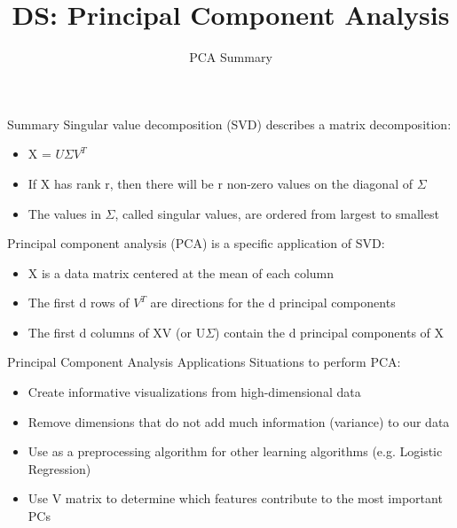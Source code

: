 \documentclass[aspectratio=169]{../latex_main/tntbeamer}  %
\title[Introduction]{DS: Principal Component Analysis}
\subtitle{PCA Summary}
\begin{document}
	
	\maketitle
	\begin{frame}{Summary}
	    Singular value decomposition (SVD) describes a matrix decomposition: 
	    \begin{itemize}
	        \item X = $U\Sigma V^T$
	        \item If X has rank r, then there will be r non-zero values on the diagonal of $\Sigma$
	        \item The values in $\Sigma$, called singular values, are ordered from largest to smallest
	    \end{itemize}
	    \bigskip
	    Principal component analysis (PCA) is a specific application of SVD:
	    \begin{itemize}
	        \item X is a data matrix centered at the mean of each column
	        \item The first d rows of $V^T$ are directions for the d principal components
	        \item The first d columns of XV (or U$\Sigma$) contain the d principal components of X
	    \end{itemize}
	\end{frame}
	
	
	
	\begin{frame}{Principal Component Analysis Applications}
	    Situations to perform PCA:
	    \begin{itemize}
	        \item Create informative visualizations from high-dimensional data
	        \item Remove dimensions that do not add much information (variance) to our data
	        \item Use as a preprocessing algorithm for other learning algorithms (e.g. Logistic Regression)
	        \item Use V matrix to determine which features contribute to the most important PCs
	    \end{itemize}
	\end{frame}
	
\end{document}
